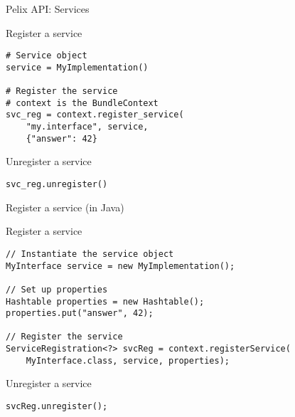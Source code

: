 \begin{frame}[fragile]{Pelix API: Services}
\begin{block}{Register a service}
\begin{verbatim}
# Service object
service = MyImplementation()

# Register the service
# context is the BundleContext
svc_reg = context.register_service(
	"my.interface", service,
	{"answer": 42}
\end{verbatim}
\end{block}

\begin{block}{Unregister a service}
\begin{verbatim}
svc_reg.unregister()
\end{verbatim}
\end{block}
\end{frame}

\begin{frame}[fragile]{Register a service (in Java)}
\begin{block}{Register a service}
\begin{verbatim}
// Instantiate the service object
MyInterface service = new MyImplementation();

// Set up properties
Hashtable properties = new Hashtable();
properties.put("answer", 42);

// Register the service
ServiceRegistration<?> svcReg = context.registerService(
	MyInterface.class, service, properties);
\end{verbatim}
\end{block}

\begin{block}{Unregister a service}
\begin{verbatim}
svcReg.unregister();
\end{verbatim}
\end{block}
\end{frame}
